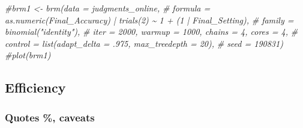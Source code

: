 \documentclass[
]{article}
\newenvironment{Shaded}{\begin{snugshade}}{\end{snugshade}}
\newcommand{\CommentTok}[1]{\textcolor[rgb]{0.56,0.35,0.01}{\textit{#1}}}
\begin{document}
\begin{Shaded}
\begin{Highlighting}[]
\CommentTok{\#brm1 \textless{}{-} brm(data = judgments\_online,}
\CommentTok{\#             formula = as.numeric(Final\_Accuracy) | trials(2) \textasciitilde{} 1 + (1 | Final\_Setting),}
\CommentTok{\#             family = binomial("identity"),}
\CommentTok{\#             iter = 2000, warmup = 1000, chains = 4, cores = 4,}
\CommentTok{\#             control = list(adapt\_delta = .975, max\_treedepth = 20),}
\CommentTok{\#             seed = 190831)}
\CommentTok{\#plot(brm1)}
\end{Highlighting}
\end{Shaded}

\subsection{Efficiency}\label{efficiency}

\subsubsection{Quotes \%, caveats}\label{quotes-caveats}
\end{document}
